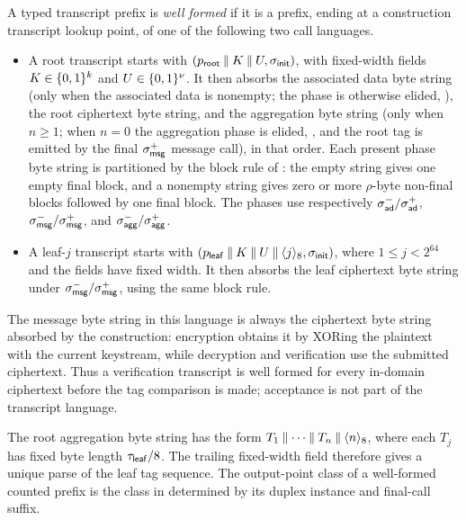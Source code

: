 \begin{definition}
\label{def:wf-transcripts}
A typed \TW{} transcript prefix is \emph{well formed} if it is a prefix,
ending at a construction transcript lookup point, of one of the following
two call languages.
\begin{itemize}
\item A root transcript starts with
  $(p_{\mathsf{root}} \mathbin{\|} K \mathbin{\|} U,\sigma_{\mathsf{init}})$, with fixed-width fields
  $K \in \{0,1\}^k$ and $U \in \{0,1\}^\nu$. It then absorbs the
  associated data byte string (only when the associated data is
  nonempty; the phase is otherwise elided, ), the root
  ciphertext byte string, and the aggregation byte string (only when
  $n \geq 1$; when $n = 0$ the aggregation phase is elided,
  , and the root tag is emitted by the final
  $\sigma_{\mathsf{msg}}^+$ message call), in that order. Each present phase byte
  string is partitioned by the block rule
  of : the empty string gives one empty final block,
  and a nonempty string gives zero or more $\rho$-byte non-final blocks
  followed by one final block. The phases use respectively
  $\sigma_{\mathsf{ad}}^-/\sigma_{\mathsf{ad}}^+$, $\sigma_{\mathsf{msg}}^-/\sigma_{\mathsf{msg}}^+$, and
  $\sigma_{\mathsf{agg}}^-/\sigma_{\mathsf{agg}}^+$.
\item A leaf-$j$ transcript starts with
  $(p_{\mathsf{leaf}} \mathbin{\|} K \mathbin{\|} U \mathbin{\|} \langle j \rangle_8,\sigma_{\mathsf{init}})$,
  where $1 \leq j < 2^{64}$ and the fields have fixed width. It then
  absorbs the leaf ciphertext byte string under
  $\sigma_{\mathsf{msg}}^-/\sigma_{\mathsf{msg}}^+$, using the same block rule.
\end{itemize}
The message byte string in this language is always the ciphertext byte
string absorbed by the construction: encryption obtains it by XORing the
plaintext with the current keystream, while decryption and verification
use the submitted ciphertext. Thus a verification transcript is well
formed for every in-domain ciphertext before the tag comparison is made;
acceptance is not part of the transcript language.

The root aggregation byte string has the form
$T_1 \mathbin{\|} \cdots \mathbin{\|} T_n \mathbin{\|} \langle n \rangle_8$, where each
$T_j$ has fixed byte length $\tau_{\mathsf{leaf}}/8$. The trailing fixed-width field
therefore gives a unique parse of the leaf tag sequence. The
output-point class of a well-formed counted prefix is the class in
 determined by its duplex instance and final-call
suffix.
\end{definition}

